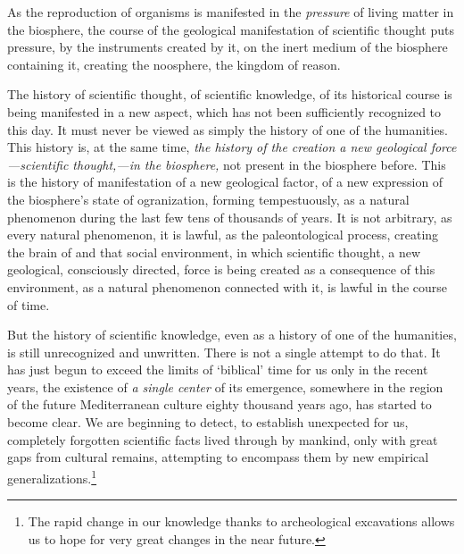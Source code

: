 As the reproduction of organisms is manifested in the \emph{pressure} of living
matter in the biosphere, the course of the geological manifestation of
scientific thought puts pressure, by the instruments created by it, on the
inert medium of the biosphere containing it, creating the noosphere, the
kingdom of reason.

The history of scientific thought, of scientific knowledge, of its historical
course is being manifested in a new aspect, which has not been sufficiently
recognized to this day.  It must never be viewed as simply the history of one
of the humanities.  This history is, at the same time, \emph{the history of the
creation a new geological force---scientific thought,---in the biosphere,} not
present in the biosphere before.  This is the history of manifestation of a new
geological factor, of a new expression of the biosphere's state of
ogranization, forming tempestuously, as a natural phenomenon during the last
few tens of thousands of years.  It is not arbitrary, as every natural
phenomenon, it is lawful, as the paleontological process, creating the brain of
 and that social environment, in which scientific thought, a
new geological, consciously directed, force is being created as a consequence
of this environment, as a natural phenomenon connected with it, is lawful in
the course of time.

But the history of scientific knowledge, even as a history of one of the
humanities, is still unrecognized and unwritten.  There is not a single attempt
to do that.  It has just begun to exceed the limits of `biblical' time for us
only in the recent years, the existence of \emph{a single center} of its
emergence, somewhere in the region of the future Mediterranean culture eighty
thousand years ago, has started to become clear.  We are beginning to detect,
to establish unexpected for us, completely forgotten scientific facts lived
through by mankind, only with great gaps from cultural remains, attempting to
encompass them by new empirical generalizations.\footnote{
	The rapid change in our knowledge thanks to archeological excavations
	allows us to hope for very great changes in the near future.
}
